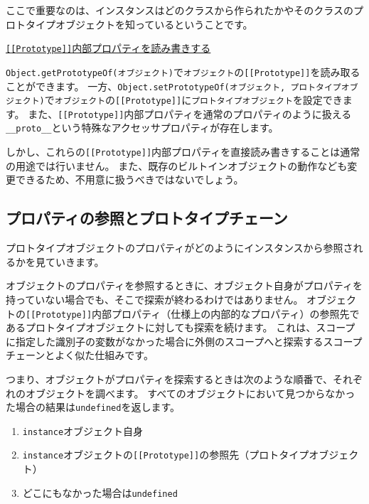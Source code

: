 ここで重要なのは、インスタンスはどのクラスから作られたかやそのクラスのプロトタイプオブジェクトを知っているということです。

\begin{note}{}
\hypertarget{inner-property}{%
\underline{\texttt{{[}{[}Prototype{]}{]}}内部プロパティを読み書きする}\label{inner-property}}

\texttt{Object.getPrototypeOf(オブジェクト)}で\texttt{オブジェクト}の\texttt{[[Prototype]]}を読み取ることができます。
一方、\texttt{Object.setPrototypeOf(オブジェクト, プロトタイプオブジェクト)}で\texttt{オブジェクト}の\texttt{[[Prototype]]}に\texttt{プロトタイプオブジェクト}を設定できます。
また、\texttt{[[Prototype]]}内部プロパティを通常のプロパティのように扱える\texttt{\_\_proto\_\_}という特殊なアクセッサプロパティが存在します。

しかし、これらの\texttt{[[Prototype]]}内部プロパティを直接読み書きすることは通常の用途では行いません。
また、既存のビルトインオブジェクトの動作なども変更できるため、不用意に扱うべきではないでしょう。
\end{note}

\hypertarget{read-prototype-chain}{%
\subsection{プロパティの参照とプロトタイプチェーン}\label{read-prototype-chain}}

プロトタイプオブジェクトのプロパティがどのようにインスタンスから参照されるかを見ていきます。

オブジェクトのプロパティを参照するときに、オブジェクト自身がプロパティを持っていない場合でも、そこで探索が終わるわけではありません。
オブジェクトの\texttt{[[Prototype]]}内部プロパティ（仕様上の内部的なプロパティ）の参照先であるプロトタイプオブジェクトに対しても探索を続けます。
これは、スコープに指定した識別子の変数がなかった場合に外側のスコープへと探索するスコープチェーンとよく似た仕組みです。

つまり、オブジェクトがプロパティを探索するときは次のような順番で、それぞれのオブジェクトを調べます。
すべてのオブジェクトにおいて見つからなかった場合の結果は\texttt{undefined}を返します。

\begin{enumerate}
\def\labelenumi{\arabic{enumi}.}
\item
  \texttt{instance}オブジェクト自身
\item
  \texttt{instance}オブジェクトの\texttt{[[Prototype]]}の参照先（プロトタイプオブジェクト）
\item
  どこにもなかった場合は\texttt{undefined}
\end{enumerate}

